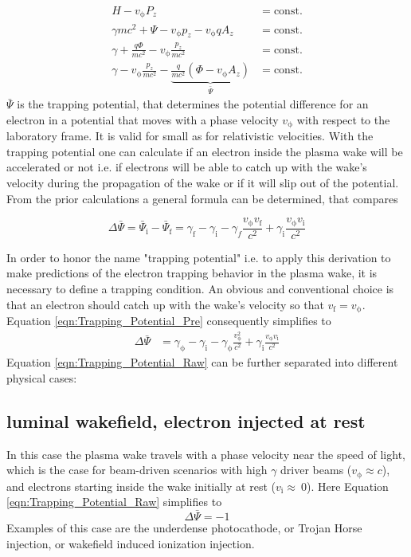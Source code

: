 \begin{align}
H-v_\mathrm{\phi}P_z &= \mathrm{const.}\\
\gamma m c^2+\Psi-v_\mathrm{\phi}p_z-v_\mathrm{\phi}qA_z &= \mathrm{const.}\\
\gamma+\frac{q \Phi}{m c^2}-v_\mathrm{\phi} \frac{p_z}{mc^2} &= \mathrm{const.}\\
\gamma - v_\mathrm{\phi} \frac{p_z}{mc^2}- \underbrace{\frac{q}{mc^2}(\Phi-v_\mathrm{\phi}A_z)}_{\bar{\Psi}}  &= \mathrm{const.} 
\end{align}
$\bar{\Psi}$ is the trapping potential, that determines the potential difference for an electron in a potential that moves with a phase velocity $v_\mathrm{\phi}$ with respect to the laboratory frame. It is valid for small as for relativistic velocities.
With the trapping potential one can calculate if an electron inside the plasma wake will be accelerated or not i.e. if electrons will be able to catch up with the wake's velocity during the propagation of the wake or if it will slip out of the potential.
From the prior calculations a general formula can be determined, that compares

\begin{equation}
\label{eqn:Trapping_Potential_Pre}
\Delta \bar{\Psi}= \bar{\Psi}_\mathrm{i}-\bar{\Psi}_\mathrm{f}=\gamma_\mathrm{f}-\gamma_\mathrm{i}-\gamma_f\frac{v_\mathrm{\phi}v_\mathrm{f}}{c^2}+\gamma_\mathrm{i}\frac{v_\mathrm{\phi}v_\mathrm{i}}{c^2} 
\end{equation}

In order to honor the name "trapping potential" i.e. to apply this derivation to make predictions of the electron trapping behavior in the plasma wake, it is necessary to define a trapping condition. 
An obvious and conventional choice is that an electron should catch up with the wake's velocity so that 
$v_\mathrm{f}=v_\mathrm{\phi}$.
Equation \ref{eqn:Trapping_Potential_Pre} consequently simplifies to 
\begin{align}
\label{eqn:Trapping_Potential_Raw}
\Delta \bar{\Psi}&= \gamma_\mathrm{\phi}-\gamma_\mathrm{i}-\gamma_\mathrm{\phi}\frac{v_\mathrm{\phi}^2}{c^2}+\gamma_\mathrm{i}\frac{v_\mathrm{\phi}v_\mathrm{i}}{c^2} 
\end{align}
Equation \ref{eqn:Trapping_Potential_Raw} can be further separated into different physical cases:
\subsection*{luminal wakefield, electron injected  at rest}
In this case the plasma wake travels with a phase velocity near the speed of light, which is the case for beam-driven scenarios with high $\gamma$ driver beams ($v_\mathrm{\phi} \approx c$), and electrons starting inside the wake initially at rest ($v_\mathrm{i} \approx \ 0$).
Here Equation \ref{eqn:Trapping_Potential_Raw} simplifies to
\begin{equation}
\label{eqn:Trapping_Potential_TH}
\Delta \bar{\Psi}=-1
\end{equation}
Examples of this case are the underdense photocathode, or Trojan Horse injection\cite{Hidding_PRL_2012}, or wakefield induced ionization injection\cite{MartinezdelaOssa2014231}.

